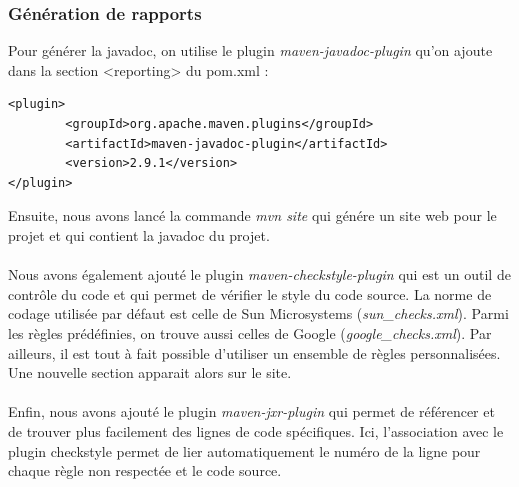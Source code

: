 \documentclass{article}
\begin{document}
\subsubsection{Génération de rapports}
Pour générer la javadoc, on utilise le plugin \textit{maven-javadoc-plugin} qu'on ajoute dans la section <reporting> du pom.xml :
\begin{verbatim}
<plugin>
        <groupId>org.apache.maven.plugins</groupId>
        <artifactId>maven-javadoc-plugin</artifactId>
        <version>2.9.1</version>
</plugin>
\end{verbatim}
Ensuite, nous avons lancé la commande \textit{mvn site} qui génére un site web pour le projet et qui contient la javadoc du projet. \\\\
Nous avons également ajouté le plugin \textit{maven-checkstyle-plugin} qui est un outil de contrôle du code et qui permet de vérifier le style du code source. La norme de codage utilisée par défaut est celle de Sun Microsystems (\textit{sun\_checks.xml}). Parmi les règles prédéfinies, on trouve aussi celles de Google (\textit{google\_checks.xml}). Par ailleurs, il est tout à fait possible d'utiliser un ensemble de règles personnalisées. Une nouvelle section apparait alors sur le site. \\\\
Enfin, nous avons ajouté le plugin \textit{maven-jxr-plugin} qui permet de référencer et de trouver plus facilement des lignes de code spécifiques.	Ici, l'association avec le plugin checkstyle permet de lier automatiquement le numéro de la ligne pour chaque règle non respectée et le code source.
\end{document}
